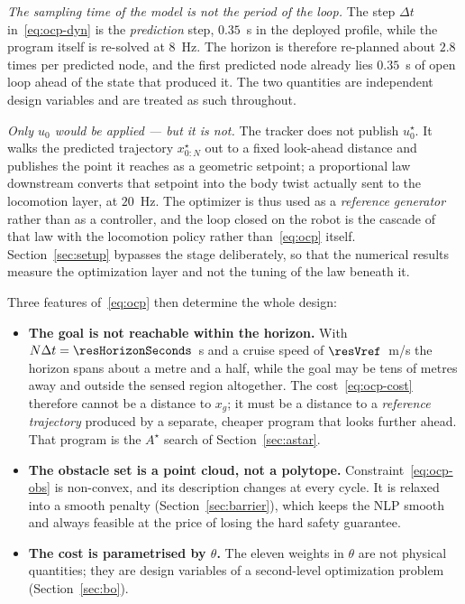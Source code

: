 \documentclass[11pt,a4paper]{article}
\newcommand{\astar}{$A^\star$}
\begin{document}
\emph{The sampling time of the model is not the period of the loop.} The step $\Delta t$
in~\eqref{eq:ocp-dyn} is the \emph{prediction} step, $0.35$~s in the deployed profile, while the program
itself is re-solved at $8$~Hz. The horizon is therefore re-planned about $2.8$ times per predicted node, and
the first predicted node already lies $0.35$~s of open loop ahead of the state that produced it. The two
quantities are independent design variables and are treated as such throughout.

\emph{Only $u_0$ would be applied --- but it is not.} The tracker does not publish $u^\star_0$. It walks the
predicted trajectory $x^\star_{0:N}$ out to a fixed look-ahead distance and publishes the point it reaches as
a geometric setpoint; a proportional law downstream converts that setpoint into the body twist actually sent
to the locomotion layer, at $20$~Hz. The optimizer is thus used as a \emph{reference generator} rather than
as a controller, and the loop closed on the robot is the cascade of that law with the locomotion policy
rather than~\eqref{eq:ocp} itself. Section~\ref{sec:setup} bypasses the stage deliberately, so that the
numerical results measure the optimization layer and not the tuning of the law beneath it.

Three features of~\eqref{eq:ocp} then determine the whole design:

\begin{itemize}
  \item \textbf{The goal is not reachable within the horizon.} With $N\Delta t=\resHorizonSeconds$~s and a
        cruise speed of $\resVref$~m/s the horizon spans about a metre and a half, while the goal may be tens of metres away
        and outside the sensed region altogether. The cost~\eqref{eq:ocp-cost} therefore cannot be a distance to $x_g$; it
        must be a distance to a \emph{reference trajectory} produced by a separate, cheaper program that
        looks further ahead. That program is the \astar{} search of Section~\ref{sec:astar}.
  \item \textbf{The obstacle set is a point cloud, not a polytope.} Constraint~\eqref{eq:ocp-obs} is
        non-convex, and its description changes at every cycle. It is relaxed into a smooth penalty
        (Section~\ref{sec:barrier}), which keeps the NLP smooth and always feasible at the price of losing
        the hard safety guarantee.
  \item \textbf{The cost is parametrised by $\theta$.} The eleven weights in $\theta$ are not physical
        quantities; they are design variables of a second-level optimization problem
        (Section~\ref{sec:bo}).
\end{itemize}
\end{document}
